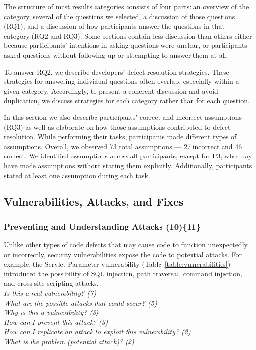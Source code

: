 \documentclass[10pt,journal,compsoc]{IEEEtran}
\begin{document}
The structure of most results categories consists of four parts: an overview of the category, several of the questions we selected, a discussion of those questions (RQ1), and a discussion of how participants answer the questions in that category (RQ2 and RQ3).
Some sections contain less discussion than others either because participants' intentions in asking questions were unclear, or participants asked questions without following up or attempting to answer them at all. 

To answer RQ2, we describe developers' defect resolution strategies.
These strategies for answering individual questions often overlap, especially within a given category.
Accordingly, to present a coherent discussion and avoid duplication, we discuss strategies for each category rather than for each question.

In this section we also describe participants' correct and incorrect assumptions (RQ3) as well as elaborate on how those assumptions contributed to defect resolution.
While performing their tasks, participants made different types of assumptions. 
Overall, we observed 73 total assumptions --- 27 incorrect and 46 correct. 
We identified assumptions across all participants, except for P3, who may have made assumptions without stating them explicitly.
Additionally, participants stated at least one assumption during each task.
%


\subsection{Vulnerabilities, Attacks, and Fixes}
\label{sec:results-vaf}

\subsubsection{Preventing and Understanding Attacks (10)\{11\}}
\label{pupa}
Unlike other types of code defects that may cause code to function unexpectedly or incorrectly, security vulnerabilities expose the code to potential attacks. For example, the Servlet Parameter vulnerability (Table~\ref{table:vulnerabilities}) introduced the possibility of SQL injection, path traversal, command injection, and cross-site scripting attacks.
\\

\noindent\emph{Is this a real vulnerability? (7)} \\
\emph{What are the possible attacks that could occur? (5)} \\
\emph{Why is this a vulnerability? (3)} \\
\emph{How can I prevent this attack? (3)} \\
\emph{How can I replicate an attack to exploit this vulnerability? (2)} \\
\emph{What is the problem (potential attack)? (2)} 
\\
\end{document}
